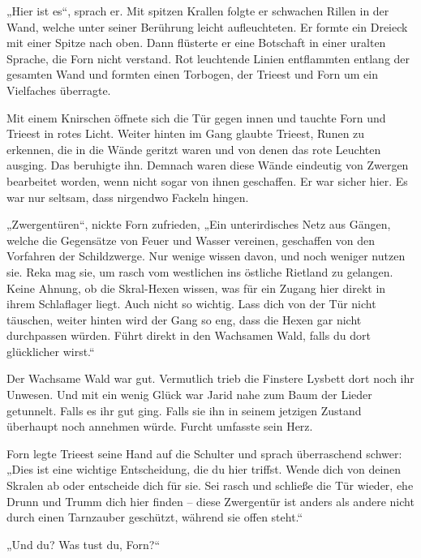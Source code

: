 „Hier ist es“, sprach er. Mit spitzen Krallen folgte er schwachen Rillen in der Wand, welche unter seiner Berührung leicht aufleuchteten. Er formte ein Dreieck mit einer Spitze nach oben. Dann flüsterte er eine Botschaft in einer uralten Sprache, die Forn nicht verstand. Rot leuchtende Linien entflammten entlang der gesamten Wand und formten einen Torbogen, der Trieest und Forn um ein Vielfaches überragte.

Mit einem Knirschen öffnete sich die Tür gegen innen und tauchte Forn und Trieest in rotes Licht. Weiter hinten im Gang glaubte Trieest, Runen zu erkennen, die in die Wände geritzt waren und von denen das rote Leuchten ausging. Das beruhigte ihn. Demnach waren diese Wände eindeutig von Zwergen bearbeitet worden, wenn nicht sogar von ihnen geschaffen. Er war sicher hier. Es war nur seltsam, dass nirgendwo Fackeln hingen.

„Zwergentüren“, nickte Forn zufrieden, „Ein unterirdisches Netz aus Gängen, welche die Gegensätze von Feuer und Wasser vereinen, geschaffen von den Vorfahren der Schildzwerge. Nur wenige wissen davon, und noch weniger nutzen sie. Reka mag sie, um rasch vom westlichen ins östliche Rietland zu gelangen. Keine Ahnung, ob die Skral-Hexen wissen, was für ein Zugang hier direkt in ihrem Schlaflager liegt. Auch nicht so wichtig. Lass dich von der Tür nicht täuschen, weiter hinten wird der Gang so eng, dass die Hexen gar nicht durchpassen würden. Führt direkt in den Wachsamen Wald, falls du dort glücklicher wirst.“

Der Wachsame Wald war gut. Vermutlich trieb die Finstere Lysbett dort noch ihr Unwesen. Und mit ein wenig Glück war Jarid nahe zum Baum der Lieder getunnelt. Falls es ihr gut ging. Falls sie ihn in seinem jetzigen Zustand überhaupt noch annehmen würde. Furcht umfasste sein Herz.

Forn legte Trieest seine Hand auf die Schulter und sprach überraschend schwer: „Dies ist eine wichtige Entscheidung, die du hier triffst. Wende dich von deinen Skralen ab oder entscheide dich für sie. Sei rasch und schließe die Tür wieder, ehe Drunn und Trumm dich hier finden – diese Zwergentür ist anders als andere nicht durch einen Tarnzauber geschützt, während sie offen steht.“

„Und du? Was tust du, Forn?“


